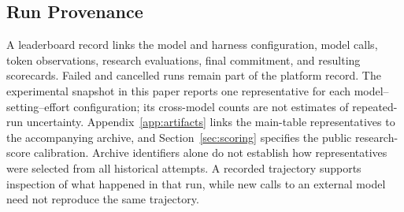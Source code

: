 \subsection{Run Provenance}

A leaderboard record links the model and harness configuration, model calls, token observations, research evaluations, final commitment, and resulting scorecards. Failed and cancelled runs remain part of the platform record. The experimental snapshot in this paper reports one representative for each model--setting--effort configuration; its cross-model counts are not estimates of repeated-run uncertainty. Appendix~\ref{app:artifacts} links the main-table representatives to the accompanying archive, and Section~\ref{sec:scoring} specifies the public research-score calibration. Archive identifiers alone do not establish how representatives were selected from all historical attempts. A recorded trajectory supports inspection of what happened in that run, while new calls to an external model need not reproduce the same trajectory.
